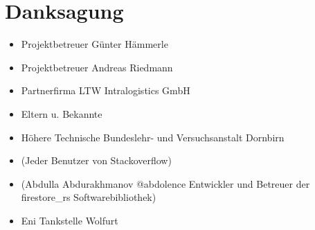 \section{Danksagung}

\begin{itemize}
  \item Projektbetreuer Günter Hämmerle
  \item Projektbetreuer Andreas Riedmann
  \item Partnerfirma LTW Intralogistics GmbH
  \item Eltern u. Bekannte
  \item Höhere Technische Bundeslehr- und Versuchsanstalt Dornbirn
  \item (Jeder Benutzer von Stackoverflow)
  \item (Abdulla Abdurakhmanov @abdolence Entwickler und Betreuer der firestore\_rs Softwarebibliothek)
  \item Eni Tankstelle Wolfurt
\end{itemize}